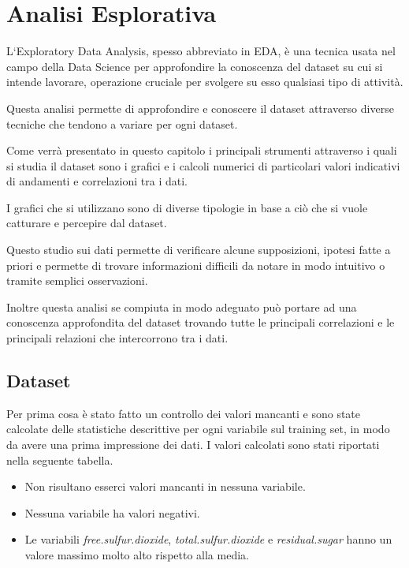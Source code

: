 \chapter{Analisi Esplorativa}
\label{ch:analisi}
L‘Exploratory Data Analysis, spesso abbreviato in EDA, è una tecnica usata nel campo della Data Science per approfondire la conoscenza del dataset su cui si intende lavorare, operazione cruciale per svolgere su esso qualsiasi tipo di attività.

\noindent
Questa analisi permette di approfondire e conoscere il dataset attraverso diverse tecniche che tendono a variare per ogni dataset.

\noindent
Come verrà presentato in questo capitolo i principali strumenti attraverso i quali si studia il dataset sono i grafici e i calcoli numerici di particolari valori indicativi di andamenti e correlazioni tra i dati.

\noindent
I grafici che si utilizzano sono di diverse tipologie in base a ciò che si vuole catturare e percepire dal dataset.

\noindent
Questo studio sui dati permette di verificare alcune supposizioni, ipotesi fatte a priori e permette di trovare informazioni difficili da notare in modo intuitivo o tramite semplici osservazioni.

\noindent
Inoltre questa analisi se compiuta in modo adeguato può portare ad una conoscenza approfondita del dataset trovando tutte le principali correlazioni e le principali relazioni che intercorrono tra i dati.

\newpage

\section{Dataset}
Per prima cosa è stato fatto un controllo dei valori mancanti e sono state calcolate delle statistiche descrittive per ogni variabile sul training set, in modo da avere una prima impressione dei dati. I valori calcolati sono stati riportati nella seguente tabella.



\begin{itemize}
    \item Non risultano esserci valori mancanti in nessuna variabile.
    \item Nessuna variabile ha valori negativi.
    \item Le variabili \textit{free.sulfur.dioxide}, \textit{total.sulfur.dioxide} e \textit{residual.sugar} hanno un valore massimo molto alto rispetto alla media.
\end{itemize}

